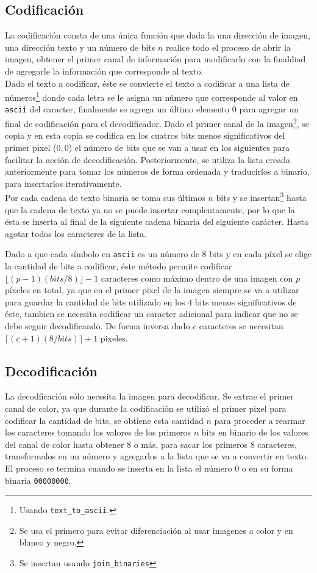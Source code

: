 \documentclass[conference]{IEEEtran}
\begin{document}
	\subsection*{Codificación}
        La codificación consta de una única función que dada la una dirección de imagen, una dirección texto y un número de bits $n$ realice todo el proceso de abrir la imagen, obtener el primer canal de información para modificarlo con la finaldiad de agregarle la información que corresponde al texto. \\
        
		Dado el texto a codificar, éste se convierte el texto a codificar a una lista de números\footnote{Usando \texttt{text\_to\_ascii}.} donde cada letra se le asigna un número que corresponde al valor en \texttt{ascii} del caracter, finalmente se agrega un último elemento $0$ para agregar un final de codificación para el decodificador.        
        Dado el primer canal de la imagen\footnote{Se usa el primero para evitar diferenciación al usar imagenes a color y en blanco y negro.}, se copia y en esta copia se codifica en los cuatros bits menos significativos del primer pixel ($0,0$) el número de bits que se van a usar en los siguientes para facilitar la acción de decodificación. Posteriormente, se utiliza la lista creada anteriormente para tomar los números de forma ordenada y traducirlos a binario, para insertarlos iterativamente. \\ 
        Por cada cadena de texto binaria se toma sus últimos $n$ bits y se insertan\footnote{Se insertan usando \texttt{join\_binaries}} hasta que la cadena de texto ya no se puede insertar complentamente, por lo que la ésta se inserta al final de la siguiente cadena binaria del siguiente carácter. Hasta agotar todos los caracteres de la lista.
    
        Dado a que cada símbolo en \texttt{ascii} es un número de 8 bits y en cada píxel se elige la cantidad de bits a codificar, éste método permite codificar $\lfloor (p-1)(bits / 8)\rfloor - 1$ caracteres como máximo dentro de una imagen con $p$ píxeles en total, ya que en el primer pixel de la imagen siempre se va a utilizar para guardar la cantidad de bits utilizado en los 4 bits menos significativos de éste, tambien se necesita codificar un caracter adicional para indicar que no se debe seguir decodificando. De forma inversa dado $c$ caracteres se necesitan $\lceil (c+1)(8 / bits)\rceil +1 $ pixeles.

	\subsection*{Decodificación}
		La decodficación sólo necesita la imagen para decodificar. Se extrae el primer canal de color, ya que durante la codificación se utilizó el primer pixel para codificar la cantidad de bits, se obtiene esta cantidad $n$ para proceder a rearmar los caracteres tomando los valores de los primeros $n$ bits en binario de los valores del canal de color hasta obtener 8 o más, para sacar los primeros 8 caracteres, transformalos en un número y agregarlos a la lista que se va a convertir en texto. El proceso se termina cuando se inserta en la lista el número $0$ o en su forma binaria \texttt{00000000}. 
		
\end{document}
